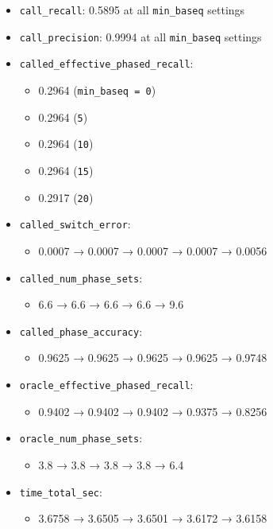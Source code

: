 \documentclass[
]{article}
\providecommand{\tightlist}{%
  \setlength{\itemsep}{0pt}\setlength{\parskip}{0pt}}
\begin{document}
\begin{itemize}
\tightlist
\item
  \texttt{call\_recall}: 0.5895 at all \texttt{min\_baseq} settings
\item
  \texttt{call\_precision}: 0.9994 at all \texttt{min\_baseq} settings
\item
  \texttt{called\_effective\_phased\_recall}:

  \begin{itemize}
  \tightlist
  \item
    0.2964 (\texttt{min\_baseq\ =\ 0})
  \item
    0.2964 (\texttt{5})
  \item
    0.2964 (\texttt{10})
  \item
    0.2964 (\texttt{15})
  \item
    0.2917 (\texttt{20})
  \end{itemize}
\item
  \texttt{called\_switch\_error}:

  \begin{itemize}
  \tightlist
  \item
    0.0007 → 0.0007 → 0.0007 → 0.0007 → 0.0056
  \end{itemize}
\item
  \texttt{called\_num\_phase\_sets}:

  \begin{itemize}
  \tightlist
  \item
    6.6 → 6.6 → 6.6 → 6.6 → 9.6
  \end{itemize}
\item
  \texttt{called\_phase\_accuracy}:

  \begin{itemize}
  \tightlist
  \item
    0.9625 → 0.9625 → 0.9625 → 0.9625 → 0.9748
  \end{itemize}
\item
  \texttt{oracle\_effective\_phased\_recall}:

  \begin{itemize}
  \tightlist
  \item
    0.9402 → 0.9402 → 0.9402 → 0.9375 → 0.8256
  \end{itemize}
\item
  \texttt{oracle\_num\_phase\_sets}:

  \begin{itemize}
  \tightlist
  \item
    3.8 → 3.8 → 3.8 → 3.8 → 6.4
  \end{itemize}
\item
  \texttt{time\_total\_sec}:

  \begin{itemize}
  \tightlist
  \item
    3.6758 → 3.6505 → 3.6501 → 3.6172 → 3.6158
  \end{itemize}
\end{itemize}
\end{document}
